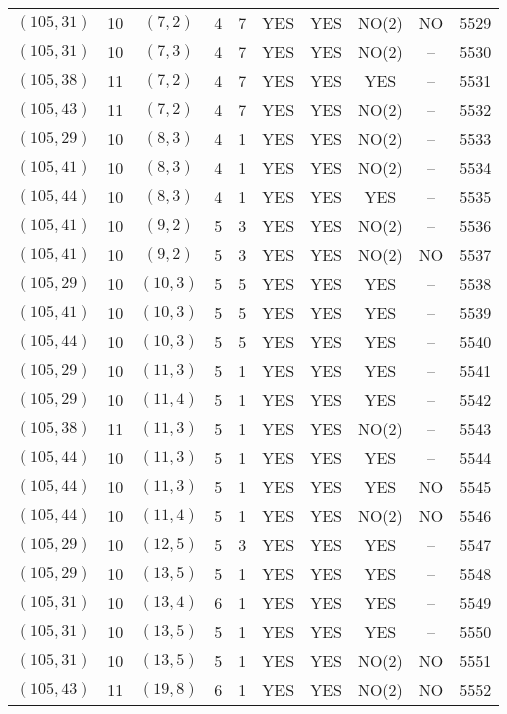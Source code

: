 \begin{longtable}{|c|c|c|c|c|c|c|c|c|c|}
$(105, 31)$ & 10 & $(7, 2)$ & 4 & 7 & YES & YES & NO(2) & NO & 5529\\
$(105, 31)$ & 10 & $(7, 3)$ & 4 & 7 & YES & YES & NO(2) & -- & 5530\\
$(105, 38)$ & 11 & $(7, 2)$ & 4 & 7 & YES & YES & YES & -- & 5531\\
$(105, 43)$ & 11 & $(7, 2)$ & 4 & 7 & YES & YES & NO(2) & -- & 5532\\
$(105, 29)$ & 10 & $(8, 3)$ & 4 & 1 & YES & YES & NO(2) & -- & 5533\\
$(105, 41)$ & 10 & $(8, 3)$ & 4 & 1 & YES & YES & NO(2) & -- & 5534\\
$(105, 44)$ & 10 & $(8, 3)$ & 4 & 1 & YES & YES & YES & -- & 5535\\
$(105, 41)$ & 10 & $(9, 2)$ & 5 & 3 & YES & YES & NO(2) & -- & 5536\\
$(105, 41)$ & 10 & $(9, 2)$ & 5 & 3 & YES & YES & NO(2) & NO & 5537\\
$(105, 29)$ & 10 & $(10, 3)$ & 5 & 5 & YES & YES & YES & -- & 5538\\
$(105, 41)$ & 10 & $(10, 3)$ & 5 & 5 & YES & YES & YES & -- & 5539\\
$(105, 44)$ & 10 & $(10, 3)$ & 5 & 5 & YES & YES & YES & -- & 5540\\
$(105, 29)$ & 10 & $(11, 3)$ & 5 & 1 & YES & YES & YES & -- & 5541\\
$(105, 29)$ & 10 & $(11, 4)$ & 5 & 1 & YES & YES & YES & -- & 5542\\
$(105, 38)$ & 11 & $(11, 3)$ & 5 & 1 & YES & YES & NO(2) & -- & 5543\\
$(105, 44)$ & 10 & $(11, 3)$ & 5 & 1 & YES & YES & YES & -- & 5544\\
$(105, 44)$ & 10 & $(11, 3)$ & 5 & 1 & YES & YES & YES & NO & 5545\\
$(105, 44)$ & 10 & $(11, 4)$ & 5 & 1 & YES & YES & NO(2) & NO & 5546\\
$(105, 29)$ & 10 & $(12, 5)$ & 5 & 3 & YES & YES & YES & -- & 5547\\
$(105, 29)$ & 10 & $(13, 5)$ & 5 & 1 & YES & YES & YES & -- & 5548\\
$(105, 31)$ & 10 & $(13, 4)$ & 6 & 1 & YES & YES & YES & -- & 5549\\
$(105, 31)$ & 10 & $(13, 5)$ & 5 & 1 & YES & YES & YES & -- & 5550\\
$(105, 31)$ & 10 & $(13, 5)$ & 5 & 1 & YES & YES & NO(2) & NO & 5551\\
$(105, 43)$ & 11 & $(19, 8)$ & 6 & 1 & YES & YES & NO(2) & NO & 5552\\

\end{longtable}
